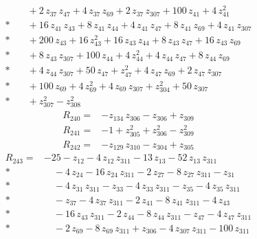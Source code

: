 \documentclass[10pt]{article}
\begin{document}
\begin{align*}
&\quad + 2\,z_{37}\,z_{47} + 4\,z_{37}\,z_{69} + 2\,z_{37}\,z_{307} + 100\,z_{41} + 4\,z_{41}^{2} \\*
&\quad + 16\,z_{41}\,z_{43} + 8\,z_{41}\,z_{44} + 4\,z_{41}\,z_{47} + 8\,z_{41}\,z_{69} + 4\,z_{41}\,z_{307} \\*
&\quad + 200\,z_{43} + 16\,z_{43}^{2} + 16\,z_{43}\,z_{44} + 8\,z_{43}\,z_{47} + 16\,z_{43}\,z_{69} \\*
&\quad + 8\,z_{43}\,z_{307} + 100\,z_{44} + 4\,z_{44}^{2} + 4\,z_{44}\,z_{47} + 8\,z_{44}\,z_{69} \\*
&\quad + 4\,z_{44}\,z_{307} + 50\,z_{47} + z_{47}^{2} + 4\,z_{47}\,z_{69} + 2\,z_{47}\,z_{307} \\*
&\quad + 100\,z_{69} + 4\,z_{69}^{2} + 4\,z_{69}\,z_{307} + z_{304}^{2} + 50\,z_{307} \\*
&\quad + z_{307}^{2} - z_{308}^{2}
\end{align*}
\begin{align*}
R_{240}={}& - z_{134}\,z_{306} - z_{306} + z_{309}
\end{align*}
\begin{align*}
R_{241}={}& - 1 + z_{305}^{2} + z_{306}^{2} - z_{309}^{2}
\end{align*}
\begin{align*}
R_{242}={}& - z_{129}\,z_{310} - z_{304} + z_{305}
\end{align*}
\begin{align*}
R_{243}={}& - 25 - z_{12} - 4\,z_{12}\,z_{311} - 13\,z_{13} - 52\,z_{13}\,z_{311} \\*
&\quad - 4\,z_{24} - 16\,z_{24}\,z_{311} - 2\,z_{27} - 8\,z_{27}\,z_{311} - z_{31} \\*
&\quad - 4\,z_{31}\,z_{311} - z_{33} - 4\,z_{33}\,z_{311} - z_{35} - 4\,z_{35}\,z_{311} \\*
&\quad - z_{37} - 4\,z_{37}\,z_{311} - 2\,z_{41} - 8\,z_{41}\,z_{311} - 4\,z_{43} \\*
&\quad - 16\,z_{43}\,z_{311} - 2\,z_{44} - 8\,z_{44}\,z_{311} - z_{47} - 4\,z_{47}\,z_{311} \\*
&\quad - 2\,z_{69} - 8\,z_{69}\,z_{311} + z_{306} - 4\,z_{307}\,z_{311} - 100\,z_{311}
\end{align*}
\end{document}
